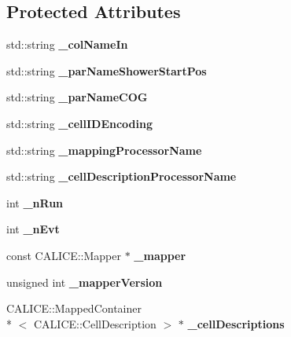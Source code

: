 \subsection*{Protected Attributes}
\begin{DoxyCompactItemize}
\item 
std\-::string {\bfseries \-\_\-col\-Name\-In}\label{classCALICE_1_1AppendLongitudinalObservables_ac54d2df825d928b37934be3934414c52}

\item 
std\-::string {\bfseries \-\_\-par\-Name\-Shower\-Start\-Pos}\label{classCALICE_1_1AppendLongitudinalObservables_a9bad51c48a3bde69262b4e638d6c81dd}

\item 
std\-::string {\bfseries \-\_\-par\-Name\-C\-O\-G}\label{classCALICE_1_1AppendLongitudinalObservables_a39e04e4a5a77c39ebd68d045e1a8013f}

\item 
std\-::string {\bfseries \-\_\-cell\-I\-D\-Encoding}\label{classCALICE_1_1AppendLongitudinalObservables_a55ef9352f95cf34642d4f305ceeffe6a}

\item 
std\-::string {\bfseries \-\_\-mapping\-Processor\-Name}\label{classCALICE_1_1AppendLongitudinalObservables_a6f5c538df04d53bbf30b9df32f67cc4e}

\item 
std\-::string {\bfseries \-\_\-cell\-Description\-Processor\-Name}\label{classCALICE_1_1AppendLongitudinalObservables_af7c86ff99ff1ba90fddde54aff75daa8}

\item 
int {\bfseries \-\_\-n\-Run}\label{classCALICE_1_1AppendLongitudinalObservables_a6c7d777eda786e1291259ee1c616475b}

\item 
int {\bfseries \-\_\-n\-Evt}\label{classCALICE_1_1AppendLongitudinalObservables_ac45ead0d4eee97d87e1a6a37b4273035}

\item 
const C\-A\-L\-I\-C\-E\-::\-Mapper $\ast$ {\bfseries \-\_\-mapper}\label{classCALICE_1_1AppendLongitudinalObservables_a399374c0a4467541baeb42870e268adb}

\item 
unsigned int {\bfseries \-\_\-mapper\-Version}\label{classCALICE_1_1AppendLongitudinalObservables_aa0c38d61ab94c36b64f61f304ad7bf35}

\item 
C\-A\-L\-I\-C\-E\-::\-Mapped\-Container\\*
$<$ C\-A\-L\-I\-C\-E\-::\-Cell\-Description $>$ $\ast$ {\bfseries \-\_\-cell\-Descriptions}\label{classCALICE_1_1AppendLongitudinalObservables_a4d64b00da8ba4464224d89e60951503a}

\end{DoxyCompactItemize}



